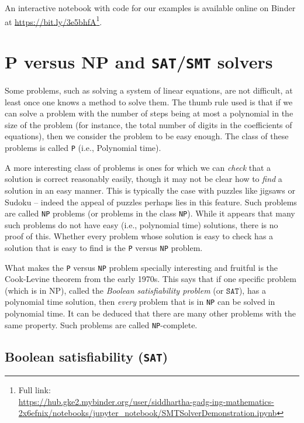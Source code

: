 \documentclass{amsart}
\theoremstyle{plain}
\theoremstyle{definition}
\theoremstyle{remark}
\begin{document}
An interactive notebook with code for our examples is available online on Binder at \url{https://bit.ly/3e5bhfA}\footnote{Full link:\\\url{https://hub.gke2.mybinder.org/user/siddhartha-gadg-ing-mathematics-2x6efnix/notebooks/jupyter_notebook/SMTSolverDemonstration.ipynb}}.

\hypertarget{p-versus-np-and-satsmt-solvers}{%
	\section{P versus NP and \texttt{SAT}/\texttt{SMT}
	  solvers}\label{p-versus-np-and-satsmt-solvers}}

Some problems, such as solving a system of linear equations, are not
difficult, at least once one knows a method to solve them. The thumb
rule used is that if we can solve a problem with the number of steps
being at most a polynomial in the size of the problem (for instance, the
total number of digits in the coefficients of equations), then we
consider the problem to be easy enough. The class of these problems is
called \texttt{P} (i.e., Polynomial time).

A more interesting class of problems is ones for which we can
\emph{check} that a solution is correct reasonably easily, though it may
not be clear how to \emph{find} a solution in an easy manner. This is
typically the case with puzzles like jigsaws or Sudoku -- indeed the
appeal of puzzles perhaps lies in this feature. Such problems are called
\texttt{NP} problems (or problems in the class \texttt{NP}). While it appears that
many such problems do not have easy (i.e., polynomial time) solutions,
there is no proof of this. Whether every problem whose solution is easy
to check has a solution that is easy to find is the \texttt{P} versus \texttt{NP}
problem.

What makes the \texttt{P} versus \texttt{NP} problem specially interesting and fruitful is the
Cook-Levine theorem from the early 1970s. This says that if one specific
problem (which is in NP), called the \emph{Boolean satisfiability problem} (or
\(\texttt{SAT}\)), has a polynomial time solution, then \emph{every} problem that
is in \texttt{NP} can be solved in polynomial time. It can be deduced that
there are many other problems with the same property. Such problems are
called \texttt{NP}-complete.

\subsection{Boolean satisfiability (\texttt{SAT})}
\end{document}
